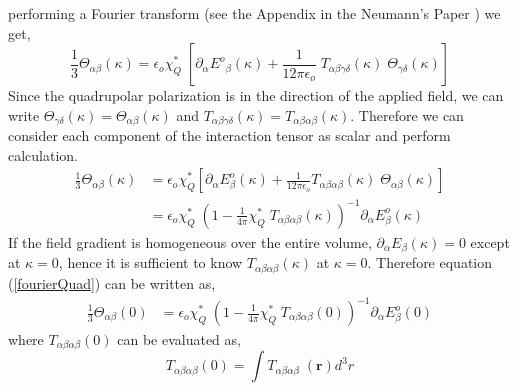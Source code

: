 performing a Fourier transform (see the Appendix in the Neumann's Paper  \cite{NeumannI83}) we get,
\begin{equation}
\frac{1}{3}{{\Theta}}_{\alpha\beta}({\kappa})=
\epsilon_o {\chi}^*_Q \;\left[{\partial_\alpha
    {E^o}_\beta}({\kappa})+ \frac{1}{12\pi
    \epsilon_o}\;{T}_{\alpha\beta\gamma\delta}({\kappa})\;
 {{\Theta}}_{\gamma\delta}({\kappa})\right] 
\end{equation} 
Since the quadrupolar polarization is in the direction of the applied
field, we can write
${{\Theta}}_{\gamma\delta}({\kappa}) =
{{\Theta}}_{\alpha\beta}({\kappa})$
and
${T}_{\alpha\beta\gamma\delta}({\kappa}) =
{T}_{\alpha\beta\alpha\beta}({\kappa})$. Therefore we can consider each component of the interaction tensor as scalar and perform calculation.
\begin{equation}
\begin{split}
\frac{1}{3}{{\Theta}}_{\alpha\beta}({\kappa}) &= \epsilon_o {\chi}^*_Q \left[{\partial_\alpha E^o_\beta}({\kappa})+ \frac{1}{12\pi \epsilon_o}{T}_{\alpha\beta\alpha\beta}({\kappa})\;{{\Theta}}_{\alpha\beta}({\kappa})\right] \\
&= \epsilon_o {\chi}^*_Q\;\left(1-\frac{1}{4\pi} {\chi}^*_Q\;
 {T}_{\alpha\beta\alpha\beta}({\kappa})\right)^{-1}
{\partial_\alpha E^o_\beta}({\kappa}) 
\end{split}
\label{fourierQuad}
\end{equation} 
If the field gradient is homogeneous over the
entire volume, ${\partial_ \alpha E_\beta}({\kappa}) = 0 $ except at
$ {\kappa} = 0$, hence it is sufficient to know
${T}_{\alpha\beta\alpha\beta}({\kappa})$ at $ {\kappa} =
0$. Therefore equation (\ref{fourierQuad}) can be written as,
\begin{equation}
\begin{split}
\frac{1}{3}{{\Theta}}_{\alpha\beta}({0}) &= \epsilon_o {\chi}^*_Q\; \left(1-\frac{1}{4\pi} {\chi}^*_Q\;{T}_{\alpha\beta\alpha\beta}({0})\right)^{-1} \partial_\alpha E^o_\beta({0})
\end{split}
\label{fourierQuad2}
\end{equation}
where $ {T}_{\alpha\beta\alpha\beta}({0})$ can be evaluated as,
\begin{equation}
{T}_{\alpha\beta\alpha\beta}({0}) = \int {T}_{\alpha\beta\alpha\beta}\;(\textbf{r})d^3r
\label{realTensorQaud}
\end{equation}

